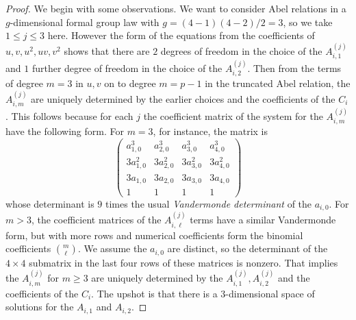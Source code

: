 \documentclass[12pt]{amsart}
\theoremstyle{theorem}
\begin{document}
\begin{proof}
We begin with some observations.  We want to consider Abel relations in a $g$-dimensional formal group law with $g = (4 - 1)(4 - 2)/2 = 3$, 
so we take $1 \le j \le 3$ here.  However the form of the equations from the coefficients of $u,v, u^2, uv, v^2$ shows that there are 
$2$ degrees of freedom in the choice of the $A_{i,1}^{(j)}$ and $1$ further degree of freedom in the choice of the $A_{i,2}^{(j)}$.  Then from the terms of degree $m = 3$ in $u,v$ on
to degree $m = p - 1$ in the truncated Abel relation, the $A_{i,m}^{(j)}$  are uniquely determined by the earlier choices and the coefficients of the $C_i$.  This follows because for
each $j$ the 
coefficient matrix of the system for the $A_{i,m}^{(j)}$ have the following form.  For $m = 3$, for instance, the matrix is
$$\begin{pmatrix}
a_{1,0}^3 & a_{2,0}^3 & a_{3,0}^3 & a_{4,0}^3\\
3 a_{1,0}^2 & 3 a_{2,0}^2 & 3 a_{3,0}^2 & 3 a_{4,0}^2\\
3 a_{1,0} & 3 a_{2,0} & 3 a_{3,0} & 3 a_{4,0}\\
1 & 1 & 1 & 1
\end{pmatrix}$$
whose determinant is $9$ times the usual \emph{Vandermonde determinant} of the $a_{i,0}$.  For $m > 3$, the coefficient matrices of the 
$A_{i,\ell}^{(j)}$ terms have a similar Vandermonde form, but with more rows and numerical coefficients form the binomial coefficients $\binom{m}{\ell}$.  
We assume the $a_{i,0}$ are distinct, so the determinant of the $4 \times 4$ submatrix in the last four rows of these matrices is nonzero.  
That implies the $A_{i,m}^{(j)}$ for $m \ge 3$ are uniquely determined by the $A_{i,1}^{(j)}, A_{i,2}^{(j)}$ and the coefficients of the $C_i$.  
The upshot is that  there is a $3$-dimensional space of solutions for the $A_{i,1}$ and $A_{i,2}$.  


\end{proof}
\end{document}
